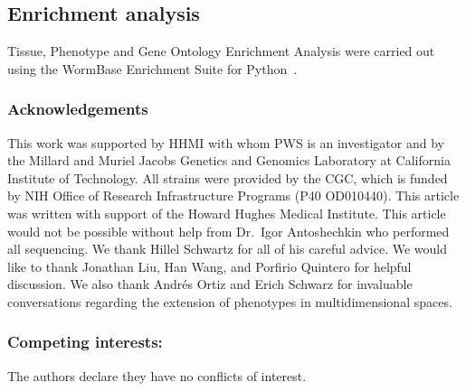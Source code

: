 \documentclass[10pt, onecolumn]{article}
\begin{document}
\subsection*{Enrichment analysis}
Tissue, Phenotype and Gene Ontology Enrichment Analysis were carried out using
the WormBase Enrichment Suite for Python~\cite{Angeles-Albores2016b,
Angeles-Albores2016}.

\subsubsection*{Acknowledgements}
This work was supported by HHMI with whom PWS is an investigator and by the
Millard and Muriel Jacobs Genetics and Genomics Laboratory at California
Institute of Technology. All strains were provided by the CGC, which is funded
by NIH Office of Research Infrastructure Programs (P40 OD010440). This article
was written with support of the Howard Hughes Medical Institute. This article
would not be possible without help from Dr.\ Igor Antoshechkin who performed all
sequencing. We thank Hillel Schwartz for all of his careful advice. We would like
to thank Jonathan Liu, Han Wang, and Porfirio Quintero for helpful discussion.
We also thank Andrés Ortiz and Erich Schwarz for invaluable conversations
regarding the extension of phenotypes in multidimensional spaces.

\subsubsection*{Competing interests:}
The authors declare they have no conflicts of interest.




\end{document}
